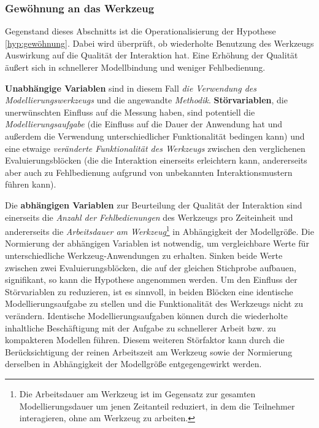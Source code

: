 
\subsubsection{Gewöhnung an das Werkzeug} %
\label{ssub:gewöhnung_an_das_werkzeug}

Gegenstand dieses Abschnitts ist die Operationalisierung der Hypothese \ref{hyp:gewöhnung}. Dabei wird überprüft, ob wiederholte Benutzung des Werkzeugs Auswirkung auf die Qualität der Interaktion hat. Eine Erhöhung der Qualität äußert sich in schnellerer Modellbindung und weniger Fehlbedienung.

\textbf{Unabhängige Variablen} sind in diesem Fall \emph{die Verwendung des Modellierungswerkzeugs} und die angewandte \emph{Methodik}. \textbf{Störvariablen}, die unerwünschten Einfluss auf die Messung haben, sind potentiell die \emph{Modellierungsaufgabe} (die Einfluss auf die Dauer der Anwendung hat und außerdem die Verwendung unterschiedlicher Funktionalität bedingen kann) und eine etwaige \emph{veränderte Funktionalität des Werkzeugs} zwischen den verglichenen Evaluierungsblöcken (die die Interaktion einerseits erleichtern kann, andererseits aber auch zu Fehlbedienung aufgrund von unbekannten Interaktionsmustern führen kann). 

Die \textbf{abhängigen Variablen} zur Beurteilung der Qualität der Interaktion sind einerseits die \emph{Anzahl der Fehlbedienungen} des Werkzeugs pro Zeiteinheit und andererseits die \emph{Arbeitsdauer am Werkzeug}\footnote{Die Arbeitsdauer am Werkzeug ist im Gegensatz zur gesamten Modellierungsdauer um jenen Zeitanteil reduziert, in dem die Teilnehmer interagieren, ohne am Werkzeug zu arbeiten.} in Abhängigkeit der Modellgröße. Die Normierung der abhängigen Variablen ist notwendig, um vergleichbare Werte für unterschiedliche Werkzeug-Anwendungen zu erhalten. Sinken beide Werte zwischen zwei Evaluierungsblöcken, die auf der gleichen Stichprobe aufbauen, signifikant, so kann die Hypothese angenommen werden. Um den Einfluss der Störvariablen zu reduzieren, ist es sinnvoll, in beiden Blöcken eine identische Modellierungsaufgabe zu stellen und die Funktionalität des Werkzeugs nicht zu verändern. Identische Modellierungsaufgaben können durch die wiederholte inhaltliche Beschäftigung mit der Aufgabe zu schnellerer Arbeit bzw. zu kompakteren Modellen führen. Diesem weiteren Störfaktor kann durch die Berücksichtigung der reinen Arbeitszeit am Werkzeug sowie der Normierung derselben in Abhängigkeit der Modellgröße entgegengewirkt werden.

